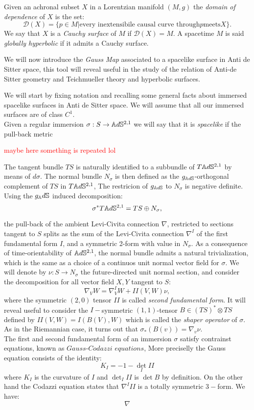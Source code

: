 \begin{definition}
    Given an achronal subset $X$ in a Lorentzian manifold $(M,g)$ the \textit{domain of dependence} of $X$ is the set: 
    \[
        \mathcal{D}(X)=\{p\in M | \text{every inextensibile causal curve through} p \text{meets} X \}.
    \]
    We say that $X$ is a \textit{Cauchy surface} of $M$ if $\mathcal{D}(X)=M$. A spacetime $M$ is said \textit{globally hyperbolic} if it admits a Cauchy surface.
\end{definition}

\begin{section}
    We will now introduce the \textit{Gauss Map} associated to a spacelike surface in Anti de Sitter space, this tool will reveal useful in the study of the relation of Anti-de Sitter geometry and Teichmueller theory and hyperbolic surfaces.

    We will start by fixing notation and recalling some general facts about immersed spacelike surfaces in Anti de Sitter space. We will assume that all our immersed surfaces are of class $C^1$. \\
    Given a regular immersion $\sigma: S\to\mathbb{A}d\mathbb{S}^{2,1}$ we will say that it is \textit{spacelike} if the pull-back metric  


\textcolor{red}{maybe here something is repeated lol}

The tangent bundle $TS$ is naturally identified to a subbundle of $T\mathbb{A}d\mathbb{S}^{2,1}$ by means of $d\sigma$. The normal bundle $N_\sigma$ is then defined as the $g_{\mathbb{A}d\mathbb{S}}$-orthogonal complement of $TS$ in $T\mathbb{A}d\mathbb{S}^{2,1}$, The restricion of $g_{\mathbb{A}d\mathbb{S}}$ to $N_\sigma$ is negative definite. Using the $g_\mathbb{A}d\mathbb{S}$ induced decomposition: 
\[
\sigma^*T\mathbb{A}d\mathbb{S}^{2,1}=TS\oplus N_\sigma,    
\]

the pull-back of the ambient Levi-Civita connection $\nabla$, restricted to sections tangent to $S$ splits as the sum of the Levi-Civita connection $\nabla^I$ of the first fundamental form $I$, and a symmetric 2-form with value in $N_\sigma$. As a consequence of time-orientability of $\mathbb{A}d\mathbb{S}^{2,1}$, the normal bundle admits a natural trivialization, which is the same as a choice of a continuos unit normal vector field for $\sigma.$ We will denote by $\nu:S\to N_\sigma$ the future-directed unit normal section, and consider the decomposition for all vector field $X,Y$ tangent to $S$: 
\[
    \nabla_V W=\nabla^I_V W+II(V,W)\nu,
\]
where the symmetric $(2,0)$ tensor $II$ is called \textit{second fundamental form}. It will reveal useful to consider the $I-$symmetric $(1,1)$-tensor $B\in (TS)^*\otimes TS$ defined by $II(V,W)=I(B(V),W)$ which is called the \textit{shaper operator} of $\sigma.$ As in the Riemannian case, it turns out that $\sigma_*(B(v))=\nabla_v\nu.$\\  
The first and second fundamental form of an immersion $\sigma$ satisfy contrainst equations, known as $\textit{Gauss-Codazzi equations}$, More preciselly the Gauss equation consists of the identity: 
\[K_I=-1-\det_I II\] where $K_I$ is the curvature of $I$ and $\det_I II$ is $\det B$ by definition. On the other hand the Codazzi equation states that $\nabla^III$ is a totally symmetric $3-$form. We have: 
\begin{equation} \nabla 
\end{equation}
\end{section}